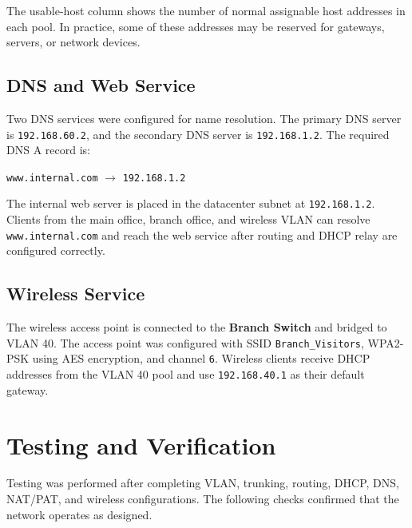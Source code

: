 \documentclass[12pt,a4paper]{article}
\begin{document}
The usable-host column shows the number of normal assignable host addresses in each pool. In practice, some of these addresses may be reserved for gateways, servers, or network devices.

\subsection{DNS and Web Service}

Two DNS services were configured for name resolution. The primary DNS server is \texttt{192.168.60.2}, and the secondary DNS server is \texttt{192.168.1.2}. The required DNS A record is:

\begin{center}
    \texttt{www.internal.com} $\rightarrow$ \texttt{192.168.1.2}
\end{center}

The internal web server is placed in the datacenter subnet at \texttt{192.168.1.2}. Clients from the main office, branch office, and wireless VLAN can resolve \texttt{www.internal.com} and reach the web service after routing and DHCP relay are configured correctly.

\subsection{Wireless Service}

The wireless access point is connected to the \textbf{Branch Switch} and bridged to VLAN 40. The access point was configured with SSID \texttt{Branch\_Visitors}, WPA2-PSK using AES encryption, and channel \texttt{6}. Wireless clients receive DHCP addresses from the VLAN 40 pool and use \texttt{192.168.40.1} as their default gateway.

\section{Testing and Verification}

Testing was performed after completing VLAN, trunking, routing, DHCP, DNS, NAT/PAT, and wireless configurations. The following checks confirmed that the network operates as designed.
\end{document}
